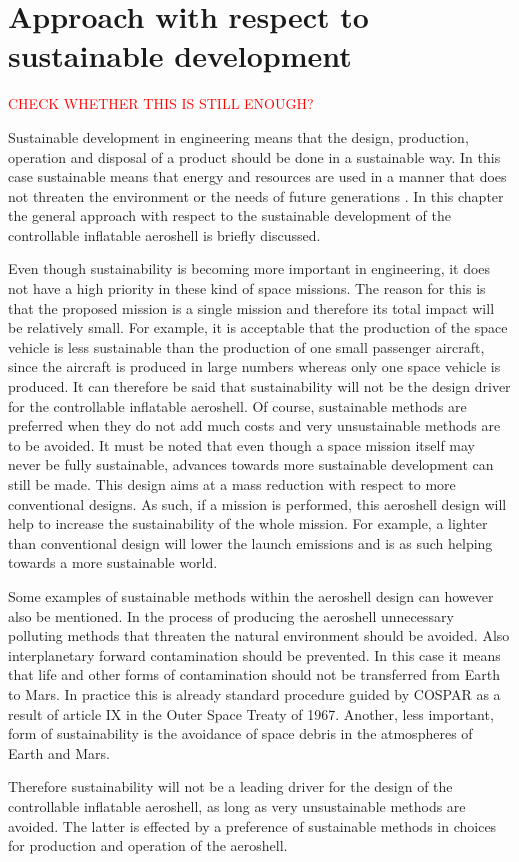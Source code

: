 \section{Approach with respect to sustainable development}\label{ch:sustain}
\textcolor{red}{CHECK WHETHER THIS IS STILL ENOUGH?}

Sustainable development in engineering means that the design, production, operation and disposal of a product should be done in a sustainable way. In this case sustainable means that energy and resources are used in a manner that does not threaten the environment or the needs of future generations \cite{Masud2011}. In this chapter the general approach with respect to the sustainable development of the controllable inflatable aeroshell is briefly discussed.

Even though sustainability is becoming more important in engineering, it does not have a high priority in these kind of space missions. The reason for this is that the proposed mission is a single mission and therefore its total impact will be relatively small. For example, it is acceptable that the production of the space vehicle is less sustainable than the production of one small passenger aircraft, since the aircraft is produced in large numbers whereas only one space vehicle is produced. It can therefore be said that sustainability will not be the design driver for the controllable inflatable aeroshell. Of course, sustainable methods are preferred when they do not add much costs and very unsustainable methods are to be avoided. It must be noted that even though a space mission itself may never be fully sustainable, advances towards more sustainable development can still be made. This design aims at a mass reduction with respect to more conventional designs. As such, if a mission is performed, this aeroshell design will help to increase the sustainability of the whole mission. For example, a lighter than conventional design will lower the launch emissions and is as such helping towards a more sustainable world.

Some examples of sustainable methods within the aeroshell design can however also be mentioned. In the process of producing the aeroshell unnecessary polluting methods that threaten the natural environment should be avoided. Also interplanetary forward contamination should be prevented. In this case it means that life and other forms of contamination should not be transferred from Earth to Mars. In practice this is already standard procedure guided by COSPAR as a result of article IX in the Outer Space Treaty of 1967. \cite{UN2008} Another, less important, form of sustainability is the avoidance of space debris in the atmospheres of Earth and Mars.

Therefore sustainability will not be a leading driver for the design of the controllable inflatable aeroshell, as long as very unsustainable methods are avoided. The latter is effected by a preference of sustainable methods in choices for production and operation of the aeroshell.